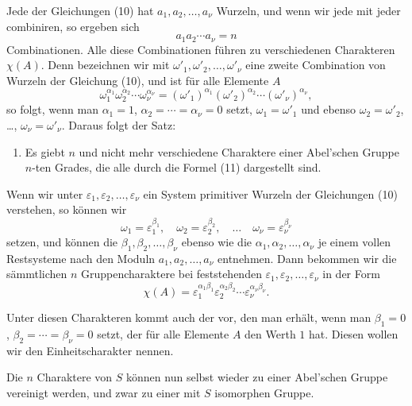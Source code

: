 \documentclass[11pt]{article}
\begin{document}
Jede der Gleichungen (10) hat $a_1,a_2,\ldots,a_\nu$ Wurzeln, und wenn wir jede mit jeder combiniren, so ergeben sich
\[
a_1a_2\cdots a_\nu=n
\]
Combinationen. Alle diese Combinationen führen zu verschiedenen Charakteren $\chi(A)$. Denn bezeichnen wir mit $\omega'_1,\omega'_2,\ldots,\omega'_\nu$ eine zweite Combination von Wurzeln der Gleichung (10), und ist für alle Elemente $A$
\[
\omega_1^{\alpha_1}\omega_2^{\alpha_2}\cdots\omega_\nu^{\alpha_\nu}
=(\omega'_1)^{\alpha_1}(\omega'_2)^{\alpha_2}\cdots(\omega'_\nu)^{\alpha_\nu},
\]
so folgt, wenn man $\alpha_1=1$, $\alpha_2=\cdots=\alpha_\nu=0$ setzt, $\omega_1=\omega'_1$ und ebenso $\omega_2=\omega'_2$, \ldots, $\omega_\nu=\omega'_\nu$. Daraus folgt der Satz:

\begin{enumerate}[resume,label=\arabic*.]
\item Es giebt $n$ und nicht mehr verschiedene Charaktere einer Abel'schen Gruppe $n$-ten Grades, die alle durch die Formel (11) dargestellt sind.
\end{enumerate}

Wenn wir unter $\varepsilon_1,\varepsilon_2,
\ldots,\varepsilon_\nu$ ein System primitiver Wurzeln der Gleichungen (10) verstehen, so können wir
\begin{equation}
\omega_1=\varepsilon_1^{\beta_1},
\quad \omega_2=\varepsilon_2^{\beta_2},
\quad\ldots\quad
\omega_\nu=\varepsilon_\nu^{\beta_\nu}
\tag{12}
\end{equation}
setzen, und können die $\beta_1,\beta_2,
\ldots,\beta_\nu$ ebenso wie die $\alpha_1,\alpha_2,
\ldots,\alpha_\nu$ je einem vollen Restsysteme nach den Moduln $a_1,a_2,
\ldots,a_\nu$ entnehmen. Dann bekommen wir die sämmtlichen $n$ Gruppencharaktere bei feststehenden $\varepsilon_1,
\varepsilon_2,
\ldots,
\varepsilon_\nu$ in der Form
\begin{equation}
\chi(A)=\varepsilon_1^{\alpha_1\beta_1}
\varepsilon_2^{\alpha_2\beta_2}
\cdots
\varepsilon_\nu^{\alpha_\nu\beta_\nu}.
\tag{13}
\end{equation}

Unter diesen Charakteren kommt auch der vor, den man erhält, wenn man $\beta_1=0$, $\beta_2=\cdots=\beta_\nu=0$ setzt, der für alle Elemente $A$ den Werth $1$ hat. Diesen wollen wir den Einheitscharakter nennen.

Die $n$ Charaktere von $S$ können nun selbst wieder zu einer Abel'schen Gruppe vereinigt werden, und zwar zu einer mit $S$ isomorphen Gruppe.
\end{document}
